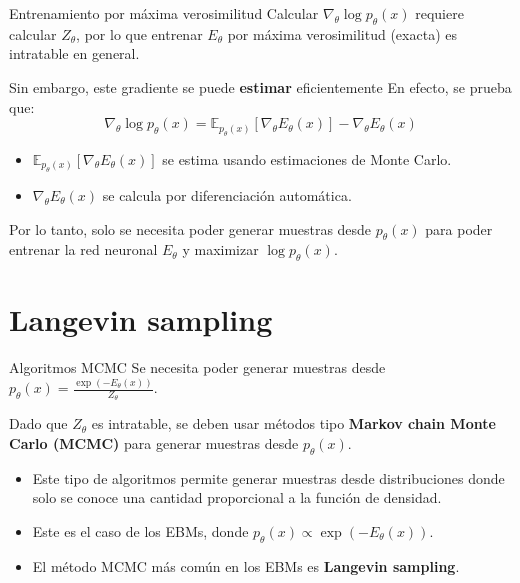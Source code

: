 \documentclass{beamer}
\begin{document}
\begin{frame}{Entrenamiento por máxima verosimilitud}
    Calcular $\nabla_\theta \log p_\theta(x)$ requiere calcular $Z_\theta$, por lo que entrenar $E_\theta$ por máxima verosimilitud (exacta) es intratable en general.

    Sin embargo, este gradiente se puede \textbf{estimar} eficientemente En efecto, se prueba que:
    \begin{equation*}
        \nabla_\theta\log p_\theta(x)=\mathbb{E}_{p_\theta(x)}\left[\nabla_\theta E_\theta(x)\right]-\nabla_\theta E_\theta(x)
    \end{equation*}
    \vspace{-0.8cm}
    \begin{itemize}
        \item $\mathbb{E}_{p_\theta(x)}\left[\nabla_\theta E_\theta(x)\right]$ se estima usando estimaciones de Monte Carlo.
        \item $\nabla_\theta E_\theta(x)$ se calcula por diferenciación automática.
    \end{itemize}
    Por lo tanto, solo se necesita poder generar muestras desde $p_\theta(x)$ para poder entrenar la red neuronal $E_\theta$ y maximizar $\log p_\theta(x)$.
\end{frame}

\section{Langevin sampling}

\begin{frame}{Algoritmos MCMC}
    Se necesita poder generar muestras desde $p_\theta(x)=\frac{\exp\left(-E_\theta(x)\right)}{Z_\theta}$.

    Dado que $Z_\theta$ es intratable, se deben usar métodos tipo \textbf{Markov chain Monte Carlo (MCMC)} para generar muestras desde $p_\theta(x)$.
    \begin{itemize}
        \item Este tipo de algoritmos permite generar muestras desde distribuciones donde solo se conoce una cantidad proporcional a la función de densidad.
        \item Este es el caso de los EBMs, donde $p_\theta(x)\propto\exp\left(-E_\theta(x)\right)$.
        \item El método MCMC más común en los EBMs es \textbf{Langevin sampling}.
    \end{itemize}
\end{frame}
\end{document}
